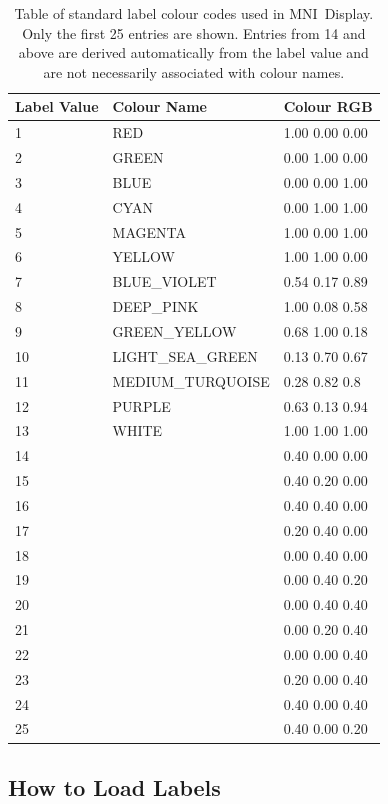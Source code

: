 \documentclass[11pt,letterpaper]{article}
\newcommand{\display}{\mbox{MNI Display}}
\begin{document}
\begin{table}
\centering
\caption{Table of standard label colour codes used in \display{}. Only
 the first 25 entries are shown. Entries from 14 and above are
 derived automatically from the label value and are not necessarily associated
with colour names.}
\begin{small}
\begin{tabular}{l|l|l}
Label Value & Colour Name & Colour RGB \\
\hline
1 & RED & 1.00 0.00 0.00 \\
2 & GREEN & 0.00 1.00 0.00 \\
3 & BLUE & 0.00 0.00 1.00 \\
4 & CYAN & 0.00 1.00 1.00\\
5 & MAGENTA & 1.00 0.00 1.00 \\
6 & YELLOW & 1.00 1.00 0.00 \\
7 & BLUE\_VIOLET & 0.54 0.17 0.89 \\
8 & DEEP\_PINK & 1.00 0.08 0.58 \\
9 & GREEN\_YELLOW & 0.68 1.00 0.18 \\
10 & LIGHT\_SEA\_GREEN & 0.13 0.70 0.67 \\
11 & MEDIUM\_TURQUOISE & 0.28 0.82 0.8 \\
12 & PURPLE & 0.63 0.13 0.94 \\
13 & WHITE & 1.00 1.00 1.00 \\
14 & & 0.40 0.00 0.00 \\
15 & & 0.40 0.20 0.00 \\
16 & & 0.40 0.40 0.00 \\
17 & & 0.20 0.40 0.00 \\
18 & & 0.00 0.40 0.00 \\
19 & & 0.00 0.40 0.20 \\
20 & & 0.00 0.40 0.40 \\
21 & & 0.00 0.20 0.40 \\
22 & & 0.00 0.00 0.40 \\
23 & & 0.20 0.00 0.40 \\
24 & & 0.40 0.00 0.40 \\
25 & & 0.40 0.00 0.20 \\
\hline
\end{tabular}
\end{small}
\label{tabLabCol}
\end{table}

\subsection{How to Load Labels}
\end{document}
